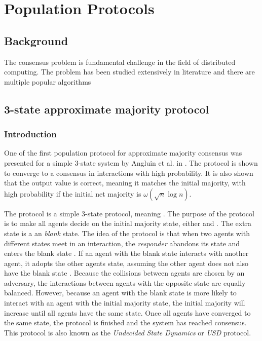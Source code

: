 \section{Population Protocols}
\subsection{Background}

The consensus problem is fundamental challenge in the field of distributed computing. The problem has been studied extensively in literature and there are multiple popular algorithms 


\subsection{3-state approximate majority protocol} \label{3stateApproximatemajority}
\subsubsection{Introduction} \label{angluinIntroduction}

One of the first population protocol for approximate majority consensus was presented for a simple 3-state system by Angluin et al. in \cite{angluinSimplePopulationProtocol2008}. The protocol is shown to converge to a consensus in  interactions with high probability. It is also shown that the output value is correct, meaning it matches the initial majority, with high probability if the initial net majority is $\omega(\sqrt{n} \log n)$. 

The protocol is a simple 3-state protocol, meaning . The purpose of the protocol is to make all agents decide on the initial majority state, either  and . The extra state  is a an \emph{blank} state. The idea of the protocol is that when two agents with different states meet in an interaction, the \emph{responder} abandons its state and enters the blank state . If an agent with the blank state  interacts with another agent, it adopts the other agents state, assuming the other agent does not also have the blank state . Because the collisions between agents are chosen by an adversary, the interactions between agents with the opposite state are equally balanced. However, because an agent with the blank state is more likely to interact with an agent with the initial majority state, the initial majority will increase until all agents have the same state. Once all agents have converged to the same state, the protocol is finished and the system has reached consensus. This protocol is also known as the \emph{Undecided State Dynamics} or \emph{USD} protocol.

